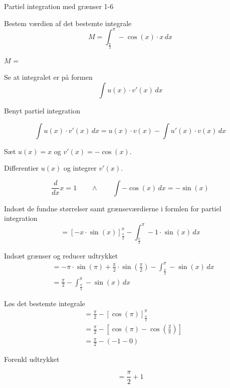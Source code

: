 \documentclass{article}
\begin{document}
\begin{exercise}{Partiel integration med grænser 1-6}
	
	
	Bestem værdien af det bestemte integrale
	\[
	M = \int_{\frac{\pi}{2}}^\pi - \cos(x) \cdot x \, dx
	\]
	
	$M$ =  \\
	
	
	\hint
	
	Se at integralet er på formen
	\[
	\int u(x) \cdot v'(x) \, dx
	\]
	
	\hint
	
	Benyt partiel integration
	
	\hint
	\[
	\int u(x) \cdot v'(x)\, dx = u(x) \cdot v(x) - \int u'(x) \cdot v(x) \, dx
	\]
	\hint
	
	Sæt $u(x) = x$ og $v'(x) = - \cos(x)$.
	
	
	\hint
	
	Differentier $u(x)$ og integrer $v'(x)$.
	
	\hint
	\[
	\frac{d}{dx}x = 1 \qquad \wedge \qquad \int -\cos(x) \, dx = - \sin(x)
	\]
	
	\hint
	
	Indsæt de fundne størrelser samt grænseværdierne i formlen for partiel integration 
	\[
	= \left[-x \cdot \sin(x) \right]_{\frac{\pi}{2}}^{\pi} - \int_{\frac{\pi}{2}}^{\pi} -1 \cdot \sin(x)  \, dx
	\]
	
	\hint
	
	Indsæt grænser og reducer udtrykket
	\begin{align*}
	&= - \pi \cdot \sin(\pi) + \frac{\pi}{2} \cdot \sin\left(\frac{\pi}{2}\right)  - \int_{\frac{\pi}{2}}^{\pi} -\sin(x) \, dx \\
	&= \frac{\pi}{2}- \int_{\frac{\pi}{2}}^{\pi} -\sin(x) \, dx
	\end{align*}
	
	\hint
	Løs det bestemte integrale
	\begin{align*}
	&= \frac{\pi}{2} - 	\left[ \cos(\pi) \right]_{\frac{\pi}{2}}^{\pi} \\
	&= \frac{\pi}{2} - \left[ \cos(\pi) - \cos\left(\frac{2}{\pi}\right) \right] \\
	&=  \frac{\pi}{2} - (-1 - 0)
	\end{align*}
	
	\hint
	Forenkl udtrykket
	
	\hint
	\[
	= \frac{\pi}{2} + 1
	\]
	
	
	
\end{exercise}
\end{document}
